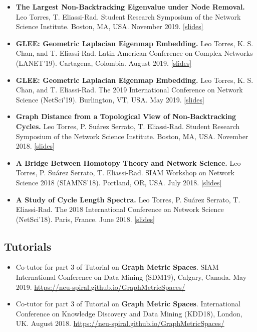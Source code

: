 \documentclass[12pt,]{scrartcl}
\begin{document}
\begin{itemize}
\leftskip-0.25in %

\item \textbf{The Largest Non-Backtracking Eigenvalue under Node Removal.} Leo Torres, T. Eliassi-Rad. Student Research Symposium of the Network Science Institute. Boston, MA, USA. November 2019. \href{http://leotrs.com/static/symposium2019.pdf}{[slides]}

\item \textbf{GLEE: Geometric Laplacian Eigenmap Embedding.} Leo Torres, K. S. Chan, and T. Eliassi-Rad. Latin American Conference on Complex Networks (LANET'19). Cartagena, Colombia. August 2019. \href{http://leotrs.com/static/GLEE_lanet19.pdf}{[slides]}

\item \textbf{GLEE: Geometric Laplacian Eigenmap Embedding.} Leo Torres, K. S. Chan, and T. Eliassi-Rad. The 2019 International Conference on Network Science (NetSci'19). Burlington, VT, USA. May 2019. \href{http://leotrs.com/static/GLEE_netsci19.pdf}{[slides]}

\item \textbf{Graph Distance from a Topological View of Non-Backtracking Cycles.} Leo Torres, P. Suárez Serrato, T. Eliassi-Rad. Student Research Symposium of the Network Science Institute. Boston, MA, USA. November 2018. \href{http://leotrs.com/static/netsci18.pdf}{[slides]}

\item \textbf{A Bridge Between Homotopy Theory and Network Science.} Leo Torres, P. Suárez Serrato, T. Eliassi-Rad. SIAM Workshop on Network Science 2018 (SIAMNS'18). Portland, OR, USA. July 2018. \href{http://leotrs.com/static/siamns18.pdf}{[slides]}

\item \textbf{A Study of Cycle Length Spectra.} Leo Torres, P. Suárez Serrato, T. Eliassi-Rad. The 2018 International Conference on Network Science (NetSci'18). Paris, France. June 2018. \href{http://leotrs.com/static/netsci18.pdf}{[slides]}

\end{itemize}

\subsection{Tutorials}\label{tutorials}

\begin{itemize}
\leftskip-0.25in

\item Co-tutor for part 3 of Tutorial on \textbf{Graph Metric Spaces}. SIAM International Conference on Data Mining (SDM19), Calgary, Canada. May 2019. \url{https://neu-spiral.github.io/GraphMetricSpaces/}

\item Co-tutor for part 3 of Tutorial on \textbf{Graph Metric Spaces}. International Conference on Knowledge Discovery and Data Mining (KDD18), London, UK. August 2018. \url{https://neu-spiral.github.io/GraphMetricSpaces/}

\end{itemize}
\end{document}
